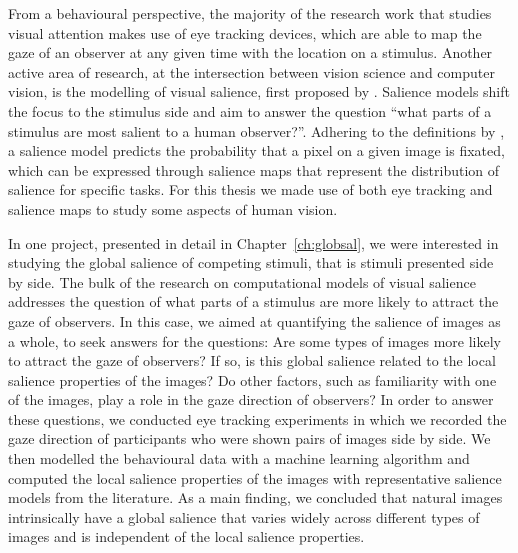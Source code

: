 {From a behavioural perspective, the majority of the research work that studies visual attention makes use of eye tracking devices, which are able to map the gaze of an observer at any given time with the location on a stimulus. Another active area of research, at the intersection between vision science and computer vision, is the modelling of visual salience, first proposed by \citet{itti1998salience}. Salience models shift the focus to the stimulus side and aim to answer the question ``what parts of a stimulus are most salient to a human observer?''. Adhering to the definitions by \citet{kuemmerer2018salience}, a salience model predicts the probability that a pixel on a given image is fixated, which can be expressed through salience maps that represent the distribution of salience for specific tasks. For this thesis we made use of both eye tracking and salience maps to study some aspects of human vision.

In one project, presented in detail in Chapter~\ref{ch:globsal}, we were interested in studying the global salience of competing stimuli, that is stimuli presented side by side. The bulk of the research on computational models of visual salience addresses the question of what parts of a stimulus are more likely to attract the gaze of observers. In this case, we aimed at quantifying the salience of images as a whole, to seek answers for the questions: Are some types of images more likely to attract the gaze of observers? If so, is this global salience related to the local salience properties of the images? Do other factors, such as familiarity with one of the images, play a role in the gaze direction of observers? In order to answer these questions, we conducted eye tracking experiments in which we recorded the gaze direction of participants who were shown pairs of images side by side. We then modelled the behavioural data with a machine learning algorithm and computed the local salience properties of the images with representative salience models from the literature. As a main finding, we concluded that natural images intrinsically have a global salience that varies widely across different types of images and is independent of the local salience properties. 

}
